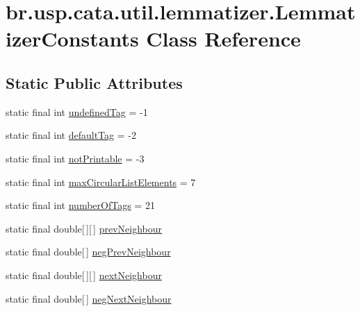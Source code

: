 \hypertarget{classbr_1_1usp_1_1cata_1_1util_1_1lemmatizer_1_1_lemmatizer_constants}{\section{br.\+usp.\+cata.\+util.\+lemmatizer.\+Lemmatizer\+Constants Class Reference}
\label{classbr_1_1usp_1_1cata_1_1util_1_1lemmatizer_1_1_lemmatizer_constants}
}
\subsection*{Static Public Attributes}
\begin{DoxyCompactItemize}
\item 
static final int \hyperlink{classbr_1_1usp_1_1cata_1_1util_1_1lemmatizer_1_1_lemmatizer_constants_ab7c088342ef43673375550f8c0332ee4}{undefined\+Tag} = -\/1
\item 
static final int \hyperlink{classbr_1_1usp_1_1cata_1_1util_1_1lemmatizer_1_1_lemmatizer_constants_ae04f3a5a4c22fa5d035f5cac2c8cc95f}{default\+Tag} = -\/2
\item 
static final int \hyperlink{classbr_1_1usp_1_1cata_1_1util_1_1lemmatizer_1_1_lemmatizer_constants_acdd6705a5423fd3a1b77f4afcac5996a}{not\+Printable} = -\/3
\item 
static final int \hyperlink{classbr_1_1usp_1_1cata_1_1util_1_1lemmatizer_1_1_lemmatizer_constants_a4283074f73595a42746d6a19a5aa882b}{max\+Circular\+List\+Elements} = 7
\item 
static final int \hyperlink{classbr_1_1usp_1_1cata_1_1util_1_1lemmatizer_1_1_lemmatizer_constants_a32e953bb66616f630ac3710b27894541}{number\+Of\+Tags} = 21
\item 
static final double\mbox{[}$\,$\mbox{]}\mbox{[}$\,$\mbox{]} \hyperlink{classbr_1_1usp_1_1cata_1_1util_1_1lemmatizer_1_1_lemmatizer_constants_a333bf29e4ff1a5bb36ffba9ddc46439e}{prev\+Neighbour}
\item 
static final double\mbox{[}$\,$\mbox{]} \hyperlink{classbr_1_1usp_1_1cata_1_1util_1_1lemmatizer_1_1_lemmatizer_constants_a00b3a125b1ad2de04062bbba0c83a093}{neg\+Prev\+Neighbour}
\item 
static final double\mbox{[}$\,$\mbox{]}\mbox{[}$\,$\mbox{]} \hyperlink{classbr_1_1usp_1_1cata_1_1util_1_1lemmatizer_1_1_lemmatizer_constants_a980c536444685e9764068d09140da5f0}{next\+Neighbour}
\item 
static final double\mbox{[}$\,$\mbox{]} \hyperlink{classbr_1_1usp_1_1cata_1_1util_1_1lemmatizer_1_1_lemmatizer_constants_a38580d128a832b170865f075403a9695}{neg\+Next\+Neighbour}
\end{DoxyCompactItemize}


